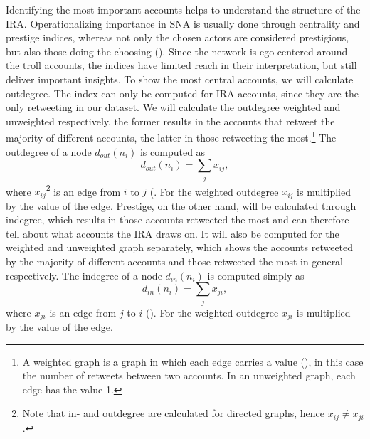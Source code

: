 \documentclass[12pt, titlepage=true, toc=bib]{scrartcl}
\begin{document}
Identifying the most important accounts helps to understand the structure of the IRA. Operationalizing importance in SNA is usually done through centrality and prestige indices, whereas not only the chosen actors are considered prestigious, but also those doing the choosing (\cite[170]{wasserman_social_1994}). Since the network is ego-centered around the troll accounts, the indices have limited reach in their interpretation, but still deliver important insights. To show the most central accounts, we will calculate outdegree. The index can only be computed for IRA accounts, since they are the only retweeting in our dataset. We will calculate the outdegree weighted and unweighted respectively, the former results in the accounts that retweet the majority of different accounts, the latter in those retweeting the most.\footnote{A weighted graph is a graph in which each edge carries a value (\cite[140]{wasserman_social_1994}), in this case the number of retweets between two accounts. In an unweighted graph, each edge has the value 1.} The outdegree of a node \( d_{out}(n_{i}) \) is computed as \[ d_{out}(n_{i}) = \sum_{j} x_{ij} ,\] where \( x_{ij} \)\footnote{Note that in- and outdegree are calculated for directed graphs, hence \( x_{ij} \neq x_{ji} \).} is an edge from \( i \) to \( j \) (\cite[cf.][178]{wasserman_social_1994}. For the weighted outdegree \( x_{ij} \) is multiplied by the value of the edge. Prestige, on the other hand, will be calculated through indegree, which results in those accounts retweeted the most and can therefore tell about what accounts the IRA draws on. It will also be computed for the weighted and unweighted graph separately, which shows the accounts retweeted by the majority of different accounts and those retweeted the most in general respectively. The indegree of a node \( d_{in}(n_{i}) \) is computed simply as \[ d_{in}(n_{i}) = \sum_{j} x_{ji} ,\] where \( x_{ji} \) is an edge from \( j \) to \( i \) (\cite[cf.][202]{wasserman_social_1994}). For the weighted outdegree \( x_{ji} \) is multiplied by the value of the edge.
\end{document}
